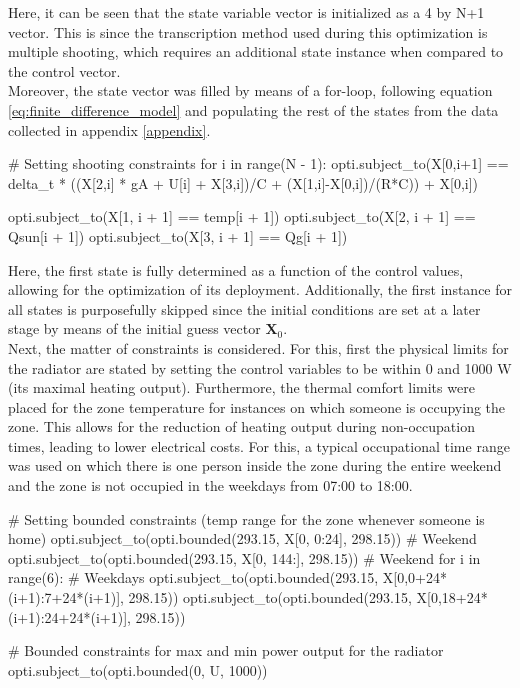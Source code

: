 Here, it can be seen that the state variable vector is initialized as a 4 by N+1 vector. This is since the transcription method used during this optimization is multiple shooting, which requires an additional state instance when compared to the control vector.\\

Moreover, the state vector was filled by means of a for-loop, following equation \ref{eq:finite_difference_model} and populating the rest of the states from the data collected in appendix \ref{appendix}.
\begin{python}[basicstyle=\small]
# Setting shooting constraints
for i in range(N - 1):
   opti.subject_to(X[0,i+1] == delta_t * ((X[2,i] * gA + U[i] + X[3,i])/C + (X[1,i]-X[0,i])/(R*C)) + X[0,i])
\end{python}    
\begin{python}
    opti.subject_to(X[1, i + 1] == temp[i + 1])
    opti.subject_to(X[2, i + 1] == Qsun[i + 1])
    opti.subject_to(X[3, i + 1] == Qg[i + 1])
\end{python}

Here, the first state is fully determined as a function of the control values, allowing for the optimization of its deployment. Additionally, the first instance for all states is purposefully skipped since the initial conditions are set at a later stage by means of the initial guess vector $\boldsymbol{X}_0$.\\

Next, the matter of constraints is considered. For this, first the physical limits for the radiator are stated by setting the control variables to be within 0 and 1000 W (its maximal heating output). Furthermore, the thermal comfort limits were placed for the zone temperature for instances on which someone is occupying the zone. This allows for the reduction of heating output during non-occupation times, leading to lower electrical costs. For this, a typical occupational time range was used on which there is one person inside the zone during the entire weekend and the zone is not occupied in the weekdays from 07:00 to 18:00.

\begin{python}
# Setting bounded constraints (temp range for the zone whenever someone is home)
opti.subject_to(opti.bounded(293.15, X[0, 0:24], 298.15))  # Weekend
opti.subject_to(opti.bounded(293.15, X[0, 144:], 298.15))  # Weekend
for i in range(6):  # Weekdays
   opti.subject_to(opti.bounded(293.15, X[0,0+24*(i+1):7+24*(i+1)], 298.15))
   opti.subject_to(opti.bounded(293.15, X[0,18+24*(i+1):24+24*(i+1)], 298.15))

# Bounded constraints for max and min power output for the radiator
opti.subject_to(opti.bounded(0, U, 1000))
\end{python}

